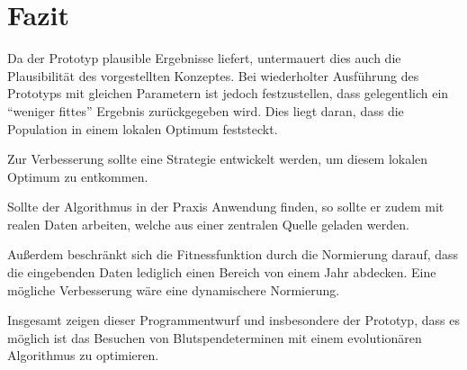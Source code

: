 \section{Fazit}\label{sec:fazit}
Da der Prototyp plausible Ergebnisse liefert,
untermauert dies auch die Plausibilität des vorgestellten Konzeptes.
Bei wiederholter Ausführung des Prototyps mit gleichen Parametern ist jedoch festzustellen,
dass gelegentlich ein \enquote{weniger fittes} Ergebnis zurückgegeben wird.
Dies liegt daran, dass die Population in einem lokalen Optimum feststeckt.

Zur Verbesserung sollte eine Strategie entwickelt werden,
um diesem lokalen Optimum zu entkommen.

Sollte der Algorithmus in der Praxis Anwendung finden,
so sollte er zudem mit realen Daten arbeiten, welche aus einer zentralen Quelle geladen werden.

Außerdem beschränkt sich die Fitnessfunktion durch die Normierung darauf,
dass die eingebenden Daten lediglich einen Bereich von einem Jahr abdecken.
Eine mögliche Verbesserung wäre eine dynamischere Normierung.

Insgesamt zeigen dieser Programmentwurf und insbesondere der Prototyp,
dass es möglich ist das Besuchen von Blutspendeterminen mit einem evolutionären Algorithmus zu optimieren.